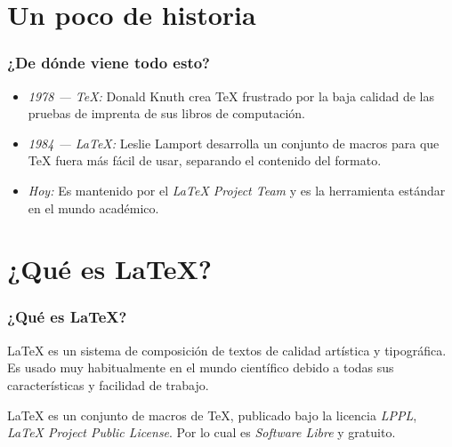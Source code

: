 \documentclass[12pt,aspectratio=169,ignorenonframetext]{ltxbeamer}
\begin{document}
\begin{frame}
\centering
\vfill
{}
\vfill
\end{frame}



\section{Un poco de historia}

\begin{frame}
    \frametitle{¿De dónde viene todo esto?}

    \pause

    \begin{itemize}
        \item<+-> \emph{1978 --- {\lmr\TeX}:} Donald Knuth crea {\lmr\TeX} frustrado por la baja calidad de las pruebas de imprenta de sus libros de computación.
        \item<+-> \emph{1984 --- {\lmr\LaTeX}:} Leslie Lamport desarrolla un conjunto de macros para que {\lmr\TeX} fuera más fácil de usar, separando el contenido del formato.
        \item<+-> \emph{Hoy:} Es mantenido por el \textit{{\lmr\LaTeX} Project Team} y es la herramienta estándar en el mundo académico.
    \end{itemize}
    \centering
    \vfill
\end{frame}



\section{¿Qué es {\lmr\LaTeX}?}
\begin{frame}
\frametitle{¿Qué es {\lmr\LaTeX}?}

\pause

{\lmr\LaTeX} es un sistema de composición de textos de calidad artística y tipográfica. Es usado muy habitualmente en el mundo científico debido a todas sus características y facilidad de trabajo.\\[2em]

\pause

{\lmr\LaTeX} es un conjunto de macros de {\lmr\TeX}, publicado bajo la licencia {\it{\lmr L}PPL}, {\it{\lmr\LaTeX} Project Public License}. Por lo cual es \emph{Software Libre} y gratuito.
\end{frame}
\end{document}

